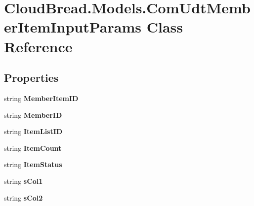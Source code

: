 \hypertarget{a00072}{}\section{Cloud\+Bread.\+Models.\+Com\+Udt\+Member\+Item\+Input\+Params Class Reference}
\label{a00072}
\subsection*{Properties}
\begin{DoxyCompactItemize}
\item 
string {\bfseries Member\+Item\+ID}\hypertarget{a00072_aa442fd4da4e3b6ce6806a74e4a7e8336}{}\label{a00072_aa442fd4da4e3b6ce6806a74e4a7e8336}

\item 
string {\bfseries Member\+ID}\hypertarget{a00072_af65ba5d47b03afb7db829e43c1719b68}{}\label{a00072_af65ba5d47b03afb7db829e43c1719b68}

\item 
string {\bfseries Item\+List\+ID}\hypertarget{a00072_a84ffaf6a70d6695c4c908c1ce981acae}{}\label{a00072_a84ffaf6a70d6695c4c908c1ce981acae}

\item 
string {\bfseries Item\+Count}\hypertarget{a00072_a14017b826a748a1ae06efb0ca9612540}{}\label{a00072_a14017b826a748a1ae06efb0ca9612540}

\item 
string {\bfseries Item\+Status}\hypertarget{a00072_aa5d252e80a5cc7f0e1ec625901a7015d}{}\label{a00072_aa5d252e80a5cc7f0e1ec625901a7015d}

\item 
string {\bfseries s\+Col1}\hypertarget{a00072_aa2f6b62bf73127af0dd8f3298c2221ed}{}\label{a00072_aa2f6b62bf73127af0dd8f3298c2221ed}

\item 
string {\bfseries s\+Col2}\hypertarget{a00072_a315989f9c7e1ebdc297a3b84115bf046}{}\label{a00072_a315989f9c7e1ebdc297a3b84115bf046}


\end{DoxyCompactItemize}
